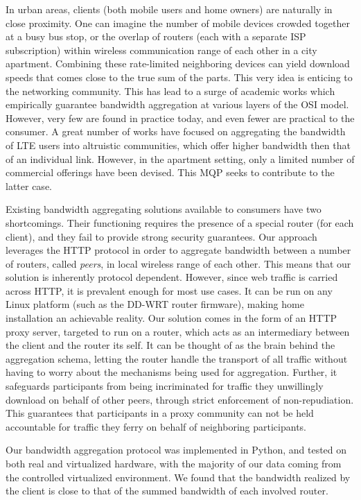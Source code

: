 \documentclass[12pt]{article}
\begin{document}
	In urban areas, clients (both mobile users and home owners) are naturally in close proximity. One can imagine the number of mobile devices crowded together at a busy bus stop, or the overlap of routers (each with a separate ISP subscription) within wireless communication range of each other in a city apartment. Combining these rate-limited neighboring devices can yield download speeds that comes close to the true sum of the parts. This very idea is enticing to the networking community. This has lead to a surge of academic works which empirically guarantee bandwidth aggregation at various layers of the OSI model. However, very few are found in practice today, and even fewer are practical to the consumer. A great number of works have focused on aggregating the bandwidth of LTE users into altruistic communities, which offer higher bandwidth then that of an individual link. However, in the apartment setting, only a limited number of commercial offerings have been devised. This MQP seeks to contribute to the latter case. 

	Existing bandwidth aggregating solutions available to consumers have two shortcomings. Their functioning requires the presence of a special router (for each client), and they fail to provide strong security guarantees. Our approach leverages the HTTP protocol in order to aggregate bandwidth between a number of routers, called {\it peers}, in local wireless range of each other. This means that our solution is inherently protocol dependent. However, since web traffic is carried across HTTP, it is prevalent enough for most use cases. It can be run on any Linux platform (such as the DD-WRT router firmware), making home installation an achievable reality. Our solution comes in the form of an HTTP proxy server, targeted to run on a router, which acts as an intermediary between the client and the router its self. It can be thought of as the brain behind the aggregation schema, letting the router handle the transport of all traffic without having to worry about the mechanisms being used for aggregation. Further, it safeguards participants from being incriminated for traffic they unwillingly download on behalf of other peers, through strict enforcement of non-repudiation. This guarantees that participants in a proxy community can not be held accountable for traffic they ferry on behalf of neighboring participants. 

	Our bandwidth aggregation protocol was implemented in Python, and tested on both real and virtualized hardware, with the majority of our data coming from the controlled virtualized environment. We found that the bandwidth realized by the client is close to that of the summed bandwidth of each involved router. 
\end{document}
